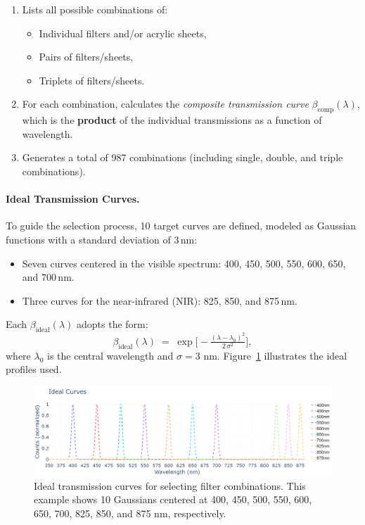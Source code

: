 \begin{enumerate}
    \item Lists all possible combinations of:
    \begin{itemize}
        \item Individual filters and/or acrylic sheets,
        \item Pairs of filters/sheets,
        \item Triplets of filters/sheets.
    \end{itemize}
    \item For each combination, calculates the \emph{composite transmission curve} \(\beta_{\text{comp}}(\lambda)\), which is the \textbf{product} of the individual transmissions as a function of wavelength.
    \item Generates a total of 987 combinations (including single, double, and triple combinations).
\end{enumerate}

\paragraph{Ideal Transmission Curves.}
To guide the selection process, 10 target curves are defined, modeled as Gaussian functions with a standard deviation of 3\,nm:

\begin{itemize}
    \item Seven curves centered in the visible spectrum: 400, 450, 500, 550, 600, 650, and 700\,nm.
    \item Three curves for the near-infrared (NIR): 825, 850, and 875\,nm.
\end{itemize}

Each \(\beta_{\text{ideal}}(\lambda)\) adopts the form:
\[
\beta_{\text{ideal}}(\lambda) \;=\; \exp\!\Big[-\tfrac{(\lambda - \lambda_0)^2}{2 \,\sigma^2}\Big],
\]
where \(\lambda_0\) is the central wavelength and \(\sigma=3\) nm.  
Figure~\ref{fig:curvas_ideales} illustrates the ideal profiles used.

\begin{figure}[h!]
    \centering
    \includegraphics[trim=0mm 0mm 0mm 25mm, clip, width=1\textwidth]{Figures/C3/ideal_spec.png}
    \caption{Ideal transmission curves for selecting filter combinations. This example shows 10 Gaussians centered at 400, 450, 500, 550, 600, 650, 700, 825, 850, and 875 nm, respectively.}
    \label{fig:curvas_ideales}
\end{figure}

